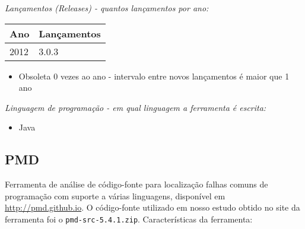 \begin{description}

  \item {\it Lançamentos ({\it Releases}) - quantos lançamentos por ano:}
    \begin{table}[h!]
      \centering
      \begin{tabular}{| l | l |}
        \hline
        Ano  & Lançamentos \\
        \hline
        2012 & 3.0.3       \\
        \hline
      \end{tabular}
    \end{table}
    \begin{itemize}
      \item Obsoleta $0$ vezes ao ano - intervalo entre novos lançamentos é maior que 1 ano
    \end{itemize}

  \item {\it Linguagem de programação - em qual linguagem a ferramenta é escrita:}
    \begin{itemize}
      \item Java
    \end{itemize}

\end{description}

\subsection{PMD}

Ferramenta de análise de código-fonte para localização falhas comuns de
programação com suporte a várias linguagens, disponível em
\url{http://pmd.github.io}.  O código-fonte utilizado em nosso estudo obtido
no site da ferramenta foi o \texttt{pmd-src-5.4.1.zip}. Características da
ferramenta:

